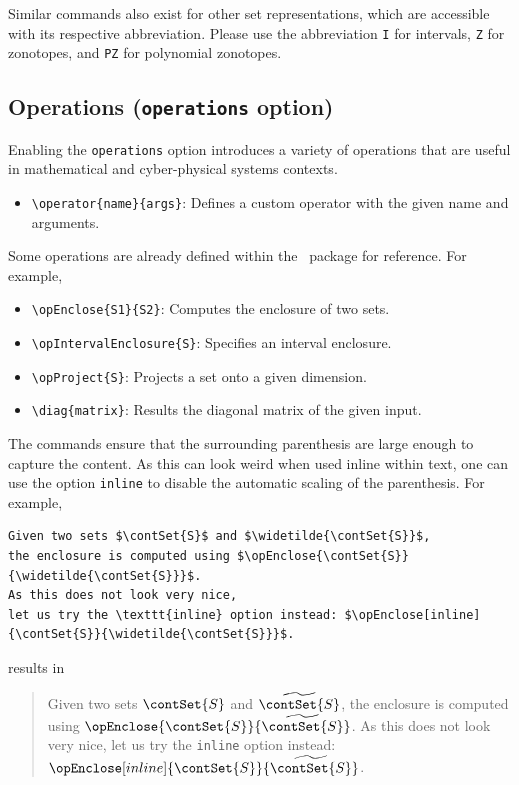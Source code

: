 \documentclass{article}
\begin{document}
Similar commands also exist for other set representations, which are accessible with its respective abbreviation.
Please use the abbreviation
\texttt{I} for intervals,
\texttt{Z} for zonotopes, and
\texttt{PZ} for polynomial zonotopes.

\subsection{Operations (\texttt{operations} option)} \label{sec:operations}
Enabling the \texttt{operations} option introduces a variety of operations that are useful in mathematical and cyber-physical systems contexts.

\begin{itemize}
  \item \verb|\operator{name}{args}|: Defines a custom operator with the given name and arguments.
\end{itemize}
Some operations are already defined within the \CORA\ package for reference. For example,
\begin{itemize}
  \item \verb|\opEnclose{S1}{S2}|: Computes the enclosure of two sets.
  \item \verb|\opIntervalEnclosure{S}|: Specifies an interval enclosure.
  \item \verb|\opProject{S}|: Projects a set onto a given dimension.
  \item \verb|\diag{matrix}|: Results the diagonal matrix of the given input.
\end{itemize}

The commands ensure that the surrounding parenthesis are large enough to capture the content.
As this can look weird when used inline within text, one can use the option \texttt{inline} to disable the automatic scaling of the parenthesis.
For example,
\begin{verbatim}
Given two sets $\contSet{S}$ and $\widetilde{\contSet{S}}$,
the enclosure is computed using $\opEnclose{\contSet{S}}{\widetilde{\contSet{S}}}$.
As this does not look very nice,
let us try the \texttt{inline} option instead: $\opEnclose[inline]{\contSet{S}}{\widetilde{\contSet{S}}}$.
\end{verbatim}
results in
\begin{quote}
  Given two sets $\contSet{S}$ and $\widetilde{\contSet{S}}$,
  the enclosure is computed using $\opEnclose{\contSet{S}}{\widetilde{\contSet{S}}}$.
  As this does not look very nice,
  let us try the \texttt{inline} option instead: $\opEnclose[inline]{\contSet{S}}{\widetilde{\contSet{S}}}$.
\end{quote}
\end{document}
